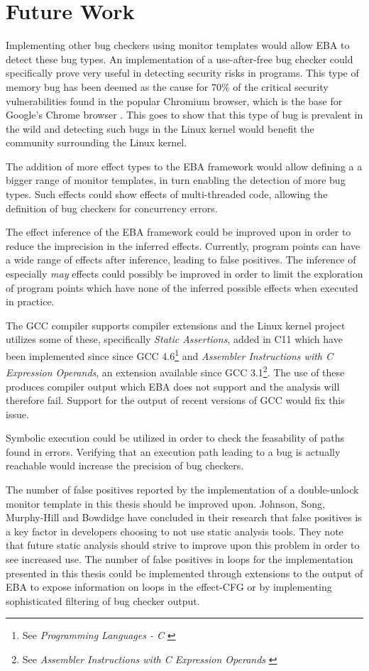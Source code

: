 \section{Future Work}

Implementing other bug checkers using monitor templates would allow EBA to detect these bug types. An implementation of a use-after-free bug checker could specifically prove very useful in detecting security risks in programs. This type of memory bug has been deemed as the cause for 70\% of the critical security vulnerabilities found in the popular Chromium browser, which is the base for Google's Chrome browser \cite{google-use-after-free}. This goes to show that this type of bug is prevalent in the wild and detecting such bugs in the Linux kernel would benefit the community surrounding the Linux kernel.

\newpar The addition of more effect types to the EBA framework would allow defining a a bigger range of monitor templates, in turn enabling the detection of more bug types. Such effects could show effects of multi-threaded code, allowing the definition of bug checkers for concurrency errors. 

\newpar The effect inference of the EBA framework could be improved upon in order to reduce the imprecision in the inferred effects. Currently, program points can have a wide range of effects after inference, leading to false positives. The inference of especially \textit{may} effects could possibly be improved in order to limit the exploration of program points which have none of the inferred possible effects when executed in practice. 

\newpar The GCC compiler supports compiler extensions and the Linux kernel project utilizes some of these, specifically \textit{Static Assertions}, added in C11 which have been implemented since since GCC 4.6\footnote{See \textit{Programming Languages - C} \cite{ISO:2011:IIIb}} and \textit{Assembler Instructions with C Expression Operands}, an extension available since GCC 3.1\footnote{See \textit{Assembler Instructions with C Expression Operands} \cite{GCC:3.1}}. The use of these produces compiler output which EBA does not support and the analysis will therefore fail. Support for the output of recent versions of GCC would fix this issue. 

\newpar Symbolic execution \cite{symbolic-execution} could be utilized in order to check the feasability of paths found in errors. Verifying that an execution path leading to a bug is actually reachable would increase the precision of bug checkers.  

\newpar The number of false positives reported by the implementation of a double-unlock monitor template in this thesis should be improved upon. Johnson, Song, Murphy-Hill and Bowdidge \cite{false-positives} have concluded in their research that false positives is a key factor in developers choosing to not use static analysis tools. They note that future static analysis should strive to improve upon this problem in order to see increased use. The number of false positives in loops for the implementation presented in this thesis could be implemented through extensions to the output of EBA to expose information on loops in the effect-CFG or by implementing sophisticated filtering of bug checker output.